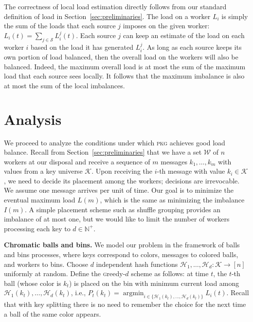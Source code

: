 \documentclass[10pt,conference,letterpaper]{IEEEtran}
\newcommand{\spara}[1]{\smallskip\noindent\textbf{#1}}
\newcommand{\hash}[1]{\ensuremath{\mathcal{H}_{#1}}\xspace}
\newcommand{\pkgs}{\textsc{pkg}\xspace}
\newcommand{\sources}{\ensuremath{\mathcal{S}}\xspace}
\newcommand{\workers}{\ensuremath{\mathcal{W}}\xspace}
\newcommand{\keyspace}{\ensuremath{\mathcal{K}}\xspace}
\begin{document}
The correctness of local load estimation directly follows from our standard definition of load in Section~\ref{sec:preliminaries}.
The load on a worker $L_i$ is simply the sum of the loads that each source $j$ imposes on the given worker:
$ L_i(t) = \sum_{j \in \sources}{L_i^j(t)}. $
Each source $j$ can keep an estimate of the load on each worker $i$ based on the load it has generated $L_i^j$. As long as each source keeps its own portion of load balanced, then the overall load on the workers will also be balanced.
Indeed, the maximum overall load is at most the sum of the maximum load that each source sees locally. 
It follows that the maximum imbalance is also at most the sum of the local imbalances. 



 \section{Analysis}
\label{sec:theory}

\newcommand{\naturals}{{\mathbb N}}
\DeclareRobustCommand{\calA}[0]{{\mathcal A}}
\DeclareRobustCommand{\calP}[0]{{\mathcal P}}
\DeclareRobustCommand{\calQ}[0]{{\mathcal Q}}
\DeclareRobustCommand{\calD}[0]{{\mathcal D}}
\DeclareRobustCommand{\calS}[0]{{\workers}}
\DeclareRobustCommand{\calK}[0]{{\keyspace}}
\newcommand{\code}[1]{{\textsc #1}}
\newcommand{\indic}{\mathbb{I}\,}




We proceed to analyze the conditions under which \pkgs achieves good load balance.
Recall from Section~\ref{sec:preliminaries} that we have a set $\calS$ of $n$ workers at our disposal and receive a sequence of $m$ messages  $k_1,
       \ldots, k_m$ with values from a key universe $\calK$. Upon receiving the $i$-th message with value $k_i\in \calK$, we need to decide its placement among the workers; decisions are irrevocable. We assume one message arrives per unit of time.
Our goal is to minimize the eventual maximum load $L(m)$, which is the same as minimizing the imbalance $I(m)$.
A simple placement scheme such as shuffle grouping provides an imbalance of at most one, but
we would like to limit the number of workers processing each key to $d \in \naturals^+$.


\spara{Chromatic balls and bins.}
We model our problem in the framework of balls and bins processes, where keys correspond to colors, messages to colored balls, and workers to bins.
Choose
 $d$ independent hash
functions $\hash{1}, \ldots, \hash{d}\colon \calK \to [n]$ uniformly at random. Define the \code{greedy-$d$} scheme as follows:
at time $t$, the $t$-th ball (whose color is $k_t$) is placed on the bin with minimum current load among
$\hash{1}(k_t), \ldots, \hash{d}(k_t)$, i.e., $P_t(k_t) = \operatorname{argmin}_{i \in \{\hash{1}(k_t),\ldots,\hash{d}(k_t)\}} L_i(t)$.
Recall that with key splitting there is no need to remember the choice for the next time a ball of the same color appears.
\end{document}
